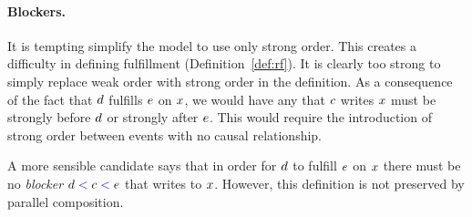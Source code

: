 
\paragraph{Blockers.}
It is tempting simplify the model to use only strong order.  This creates a
difficulty in defining fulfillment (Definition~\ref{def:rf}).  It is clearly
too strong to simply replace weak order with strong order in the definition.
As a consequence of the fact that $d$ fulfills $e$ on $x$, we would
have any that $c$ writes $x$ must be strongly before $d$ or
strongly after $e$.  This would require the introduction of strong order
between events with no causal relationship.

A more sensible candidate says that in order for $d$ to fulfill $e$ on
$x$ there must be no \emph{blocker} $d \mathrel{{\color{blue}<}} c \mathrel{{\color{blue}<}} e$ that writes
to $x$.  However, this definition is not preserved by parallel
composition.

